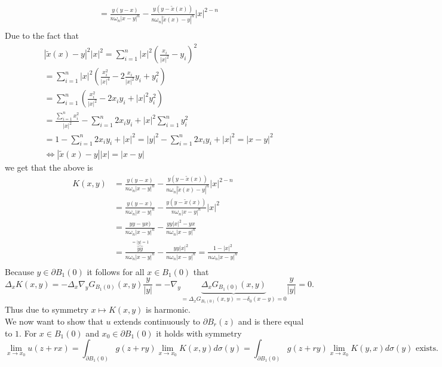 \documentclass[A4,12pt,twoside]{book}
\begin{document}
{\begin{align*}
        &=  \frac{y(y-x) }{n \omega_n |x-y|^n }- \frac{y(y-\tilde{x}(x)) }{n \omega_n |\tilde{x}(x)-y|^n }|x|^{2-n}   \\
    \end{align*}
    Due to the fact that 
    \begin{align*}
        &|\tilde{x}(x) -y|^2 |x|^2 = \sum_{i=1}^n |x|^2 \left( \frac{x_i}{|x|^2} - y_i \right)^2 \\
        &= \sum_{i=1}^n |x|^2 \left( \frac{x_i^2}{|x|^4}- 2 \frac{x_i}{|x|^2} y_i + y_i^2 \right) \\
        &= \sum_{i=1}^n  \left( \frac{x_i^2}{|x|^2}- 2 x_i y_i +|x|^2 y_i^2 \right) \\
        &=  \frac{\sum_{i=1}^n x_i^2}{|x|^2}- \sum_{i=1}^n 2 x_i y_i +|x|^2 \sum_{i=1}^n y_i^2  \\
        &=  1- \sum_{i=1}^n 2 x_i y_i +|x|^2  = |y|^2 -\sum_{i=1}^n 2 x_i y_i +|x|^2 = |x-y|^2\\
        & \iff |\tilde{x}(x) -y| |x| = |x-y|
    \end{align*}
    we get that the above is 
    \begin{align*}
        K(x,y) &= \frac{y(y-x) }{n \omega_n |x-y|^n }- \frac{y(y-\tilde{x}(x)) }{n \omega_n |\tilde{x}(x)-y|^n }|x|^{2-n}   \\
        &= \frac{y(y-x) }{n \omega_n |x-y|^n }- \frac{y(y-\tilde{x}(x)) }{n \omega_n |x-y|^n }|x|^{2} \\
        &= \frac{yy-yx) }{n \omega_n |x-y|^n }- \frac{y y|x|^2 -y x  }{n \omega_n |x-y|^n } \\
        &= \frac{ \overbrace{yy}^{= |y|=1} }{n \omega_n |x-y|^n }- \frac{y y|x|^2  }{n \omega_n |x-y|^n } = \frac{1-|x|^2  }{n \omega_n |x-y|^n } \\
    \end{align*}
    Because $y \in \partial B_1 (0)$ it follows for all $x \in B_1 (0)$ that 
    \[
    \Delta_x K(x,y) = - \Delta_x \nabla_y G_{B_1 (0)} (x,y) \frac{y}{|y|} = - \nabla_y \underbrace{\Delta_x G_{B_1 (0)} (x,y)}_{= \Delta_x G_{B_1 (0) } (x,y) = - \delta_0 (x-y) =0} \frac{y}{|y|} =0.
    \]
    Thus due to symmetry $x \mapsto K(x,y) $ is harmonic.\\
    We now want to show that $u$ extends continuously to $\partial B_r (z)$ and is there equal to $1$. For $x \in B_1 (0)$ and $x_0 \in \partial B_1 (0)$ it holds with symmetry 
    \[
    \lim_{x \to x_0} u(z+rx) = \int_{\partial B_1 (0)} g(z+ry) \lim_{x \to x_0} K(x,y) d \sigma (y) = \int_{\partial B_1 (0)} g(z+ry) \lim_{x \to x_0} K(y,x) d \sigma (y) \text{ exists.}
\]}
\end{document}
